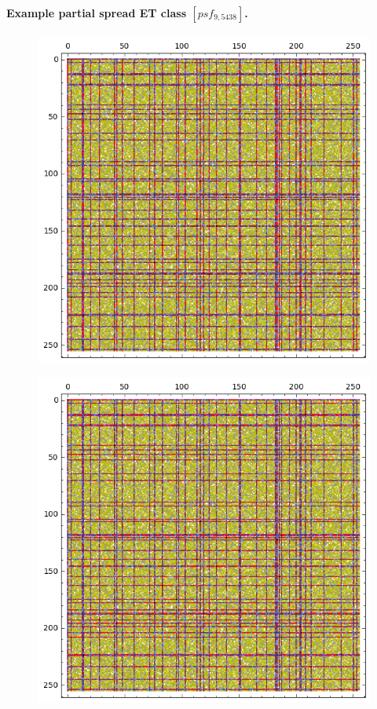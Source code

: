 \documentclass[12pt,a4paper]{article}
\begin{document}
\paragraph*{Example partial spread ET class $[psf_{9,5438}]$.}
\begin{figure}[!hb]
\centering
\begin{minipage}{.48\textwidth}
  \centering
  \includegraphics[width=.9\linewidth]{../matrix_plot/psf_9_5438_bent_cayley_graph_index_matrix.png}
  \label{fig:psf_9_5438_bent_cayley_graph_index_matrix}
\end{minipage}
\begin{minipage}{.48\textwidth}
  \centering
  \includegraphics[width=.9\linewidth]{../matrix_plot/psf_9_5438_dual_cayley_graph_index_matrix.png}
  \label{fig:psf_9_5438_dual_cayley_graph_index_matrix}
\end{minipage}%
\end{figure}
\end{document}
